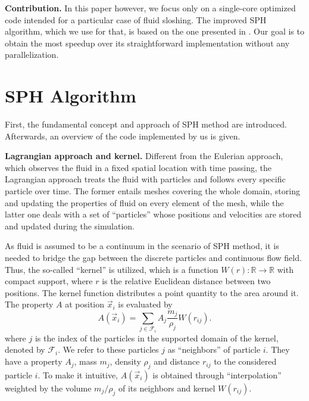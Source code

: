 \documentclass[letterpaper]{article}
\newcommand{\mypar}[1]{{\bf #1.}}
\begin{document}
\mypar{Contribution}
In this paper however, we focus only on a single-core optimized code intended for a particular case of fluid sloshing. The improved SPH algorithm, which we use for that, is based on the one presented in \cite{Shao_Li_Liu_Liu_2012}.
Our goal is to obtain the most speedup over its straightforward implementation without any parallelization.

\section{SPH Algorithm}\label{sec:background}
First, the fundamental concept and approach of SPH method are introduced.  Afterwards, an overview of the code implemented by us is given.

\mypar{Lagrangian approach and kernel}
Different from the Eulerian approach, which observes the fluid in a fixed spatial location with time passing, the Lagrangian approach treats the fluid with particles and follows every specific particle over time. The former entails meshes covering the whole domain, storing and updating the properties of fluid on every element of the mesh, while the latter one deals with a set of ``particles'' whose positions and velocities are stored and updated during the simulation.

As fluid is assumed to be a continuum in the scenario of SPH method, it is needed to bridge the gap between the discrete particles and continuous flow field. Thus, the so-called ``kernel'' is utilized, which is a function $W(r): \mathbb{R} \rightarrow \mathbb{R}$ with compact support, where $r$ is the relative Euclidean distance between two positions. The kernel function distributes a point quantity to the area around it. The property $A$ at position $\Vec{x}_i$ is evaluated by
\begin{equation}\label{eq-1}
A(\Vec{x}_i) = \sum_{j\in\mathcal{F}_{i}}A_{j}\frac{m_{j}}{\rho_{j}}W(r_{ij}).
\end{equation}
where $j$ is the index of the particles in the supported domain of the kernel, denoted by $\mathcal{F}_i$. We refer to these particles $j$ as ``neighbors'' of particle $i$. They have a property $A_j$, mass $m_j$, density $\rho_j$ and distance $r_{ij}$ to the considered particle $i$. To make it intuitive, $A(\Vec{x}_i)$ is obtained through ``interpolation'' weighted by the volume $m_j / \rho_j$ of its neighbors and kernel $W(r_{ij})$.
\end{document}
